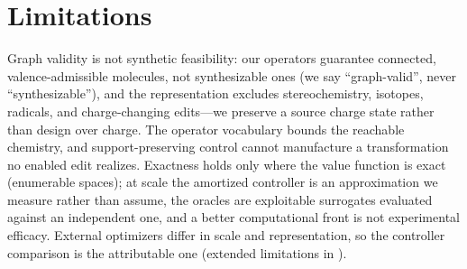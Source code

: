 \section{Limitations}
\label{sec:limitations}

Graph validity is not synthetic feasibility: our operators guarantee connected, valence-admissible
molecules, not synthesizable ones (we say ``graph-valid'', never ``synthesizable''), and the
representation excludes stereochemistry, isotopes, radicals, and charge-changing edits---we preserve a
source charge state rather than design over charge. The operator vocabulary bounds the reachable
chemistry, and support-preserving control cannot manufacture a transformation no enabled edit realizes.
Exactness holds only where the value function is exact (enumerable spaces); at scale the amortized
controller is an approximation we measure rather than assume, the oracles are exploitable surrogates
evaluated against an independent one, and a better computational front is not experimental efficacy.
External optimizers differ in scale and representation, so the controller comparison is the attributable
one (extended limitations in ).
